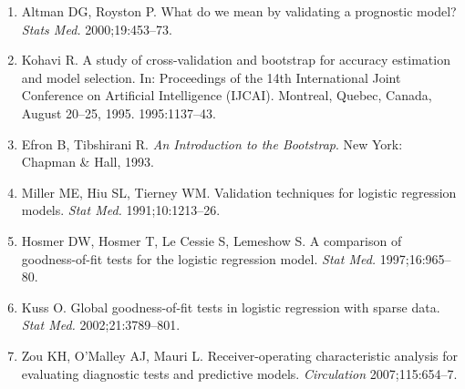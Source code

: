 \begin{enumerate}
  \item Altman DG, Royston P. What do we mean by validating a prognostic model? \textit{Stats Med.} 2000;19:453–73.
  \item Kohavi R. A study of cross-validation and bootstrap for accuracy estimation and model selection. In: Proceedings of the 14th International Joint Conference on Artificial Intelligence (IJCAI). Montreal, Quebec, Canada, August 20–25, 1995. 1995:1137–43.
  \item Efron B, Tibshirani R. \textit{An Introduction to the Bootstrap}. New York: Chapman & Hall, 1993.
  \item Miller ME, Hiu SL, Tierney WM. Validation techniques for logistic regression models. \textit{Stat Med.} 1991;10:1213–26.
  \item Hosmer DW, Hosmer T, Le Cessie S, Lemeshow S. A comparison of goodness-of-fit tests for the logistic regression model. \textit{Stat Med.} 1997;16:965–80.
  \item Kuss O. Global goodness-of-fit tests in logistic regression with sparse data. \textit{Stat Med.} 2002;21:3789–801.
  \item Zou KH, O'Malley AJ, Mauri L. Receiver-operating characteristic analysis for evaluating diagnostic tests and predictive models. \textit{Circulation} 2007;115:654–7.
\end{enumerate}
